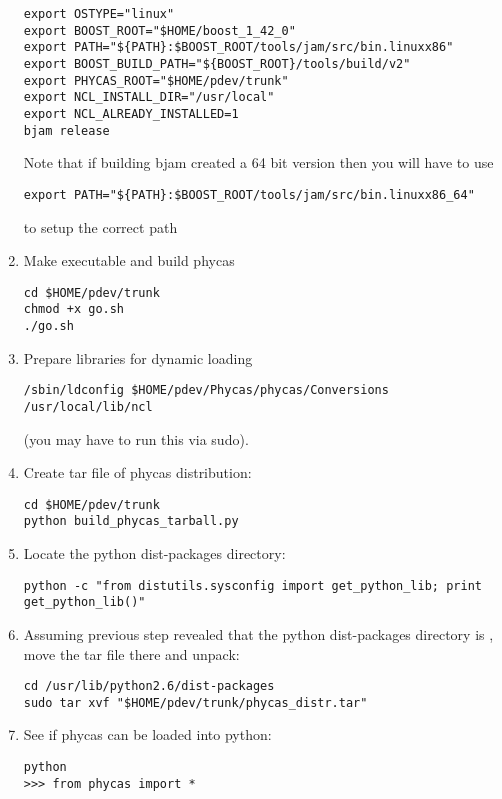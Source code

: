 \begin{enumerate}
\begin{verbatim}
export OSTYPE="linux"
export BOOST_ROOT="$HOME/boost_1_42_0"
export PATH="${PATH}:$BOOST_ROOT/tools/jam/src/bin.linuxx86"
export BOOST_BUILD_PATH="${BOOST_ROOT}/tools/build/v2"
export PHYCAS_ROOT="$HOME/pdev/trunk"
export NCL_INSTALL_DIR="/usr/local"
export NCL_ALREADY_INSTALLED=1
bjam release
\end{verbatim}

Note that if building bjam created a 64 bit version then you will have to use
\begin{verbatim}
export PATH="${PATH}:$BOOST_ROOT/tools/jam/src/bin.linuxx86_64"
\end{verbatim}
to setup the correct path

%
\item Make  executable and build phycas
\begin{verbatim}
cd $HOME/pdev/trunk
chmod +x go.sh
./go.sh
\end{verbatim}
%
\item Prepare libraries for dynamic loading
\begin{verbatim}
/sbin/ldconfig $HOME/pdev/Phycas/phycas/Conversions /usr/local/lib/ncl
\end{verbatim}
(you may have to run this via sudo).
%
\item Create tar file of phycas distribution:
\begin{verbatim}
cd $HOME/pdev/trunk
python build_phycas_tarball.py
\end{verbatim}
%
\item Locate the python dist-packages directory:
\begin{verbatim}
python -c "from distutils.sysconfig import get_python_lib; print get_python_lib()"
\end{verbatim}
%
\item Assuming previous step revealed that the python dist-packages directory is , move the tar file there and unpack:
\begin{verbatim}
cd /usr/lib/python2.6/dist-packages
sudo tar xvf "$HOME/pdev/trunk/phycas_distr.tar"
\end{verbatim}
%
\item See if phycas can be loaded into python:
\begin{verbatim}
python
>>> from phycas import *
\end{verbatim}


\end{enumerate}
